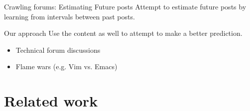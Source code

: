 \documentclass[compress]{beamer}
\begin{document}
\begin{frame}{Crawling forums: Estimating Future posts}
	Attempt to estimate future posts by learning from intervals between past posts.
	
\end{frame}
\begin{frame}{Our approach}
	Use the content as well to attempt to make a better prediction.
	\begin{itemize}
		\item Technical forum discussions
		\item Flame wars (e.g. Vim vs. Emacs)
	\end{itemize}
\end{frame}






\section{Related work}
\end{document}
